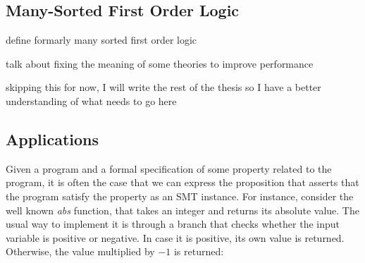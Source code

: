 




\subsection{Many-Sorted First Order Logic}\label{sec:msfolHere}

define formarly many sorted first order logic

talk about fixing the meaning of some theories to improve performance

skipping this for now, I will write the rest of the thesis so I have a better understanding of what needs to go here

\subsection{Applications}

Given a program and a formal specification of some property related to the program, it is often  the case that we can express the proposition that asserts that the program satisfy the property as an SMT instance. For instance, consider the well known \textit{abs} function, that takes an integer and returns its absolute value. The usual way to implement it is through a branch that checks whether the input variable is positive or negative. In case it is positive, its own value is returned. Otherwise, the value multiplied by $-1$ is returned:

